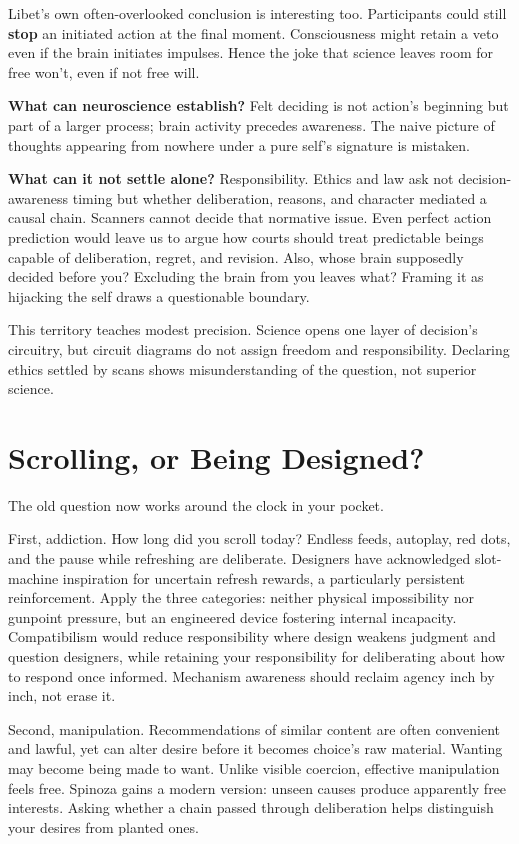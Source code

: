 Libet's own often-overlooked conclusion is interesting too. Participants could still \textbf{stop} an initiated action at the final moment. Consciousness might retain a veto even if the brain initiates impulses. Hence the joke that science leaves room for free won't, even if not free will.

\textbf{What can neuroscience establish?} Felt deciding is not action's beginning but part of a larger process; brain activity precedes awareness. The naive picture of thoughts appearing from nowhere under a pure self's signature is mistaken.

\textbf{What can it not settle alone?} Responsibility. Ethics and law ask not decision-awareness timing but whether deliberation, reasons, and character mediated a causal chain. Scanners cannot decide that normative issue. Even perfect action prediction would leave us to argue how courts should treat predictable beings capable of deliberation, regret, and revision. Also, whose brain supposedly decided before you? Excluding the brain from you leaves what? Framing it as hijacking the self draws a questionable boundary.

This territory teaches modest precision. Science opens one layer of decision's circuitry, but circuit diagrams do not assign freedom and responsibility. Declaring ethics settled by scans shows misunderstanding of the question, not superior science.

\section{Scrolling, or Being Designed?}
The old question now works around the clock in your pocket.

First, addiction. How long did you scroll today? Endless feeds, autoplay, red dots, and the pause while refreshing are deliberate. Designers have acknowledged slot-machine inspiration for uncertain refresh rewards, a particularly persistent reinforcement. Apply the three categories: neither physical impossibility nor gunpoint pressure, but an engineered device fostering internal incapacity. Compatibilism would reduce responsibility where design weakens judgment and question designers, while retaining your responsibility for deliberating about how to respond once informed. Mechanism awareness should reclaim agency inch by inch, not erase it.

Second, manipulation. Recommendations of similar content are often convenient and lawful, yet can alter desire before it becomes choice's raw material. Wanting may become being made to want. Unlike visible coercion, effective manipulation feels free. Spinoza gains a modern version: unseen causes produce apparently free interests. Asking whether a chain passed through deliberation helps distinguish your desires from planted ones.

